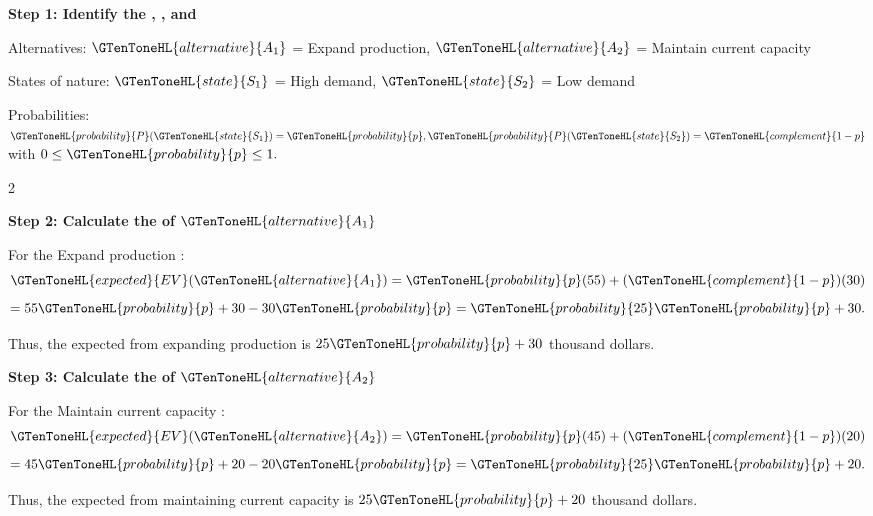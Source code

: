 	\textbf{Step 1: Identify the ,   , and }
	
	Alternatives:
	$\GTenToneHL{alternative}{A_1}$ = Expand production,
	$\GTenToneHL{alternative}{A_2}$ = Maintain current capacity
	
	States of nature:
	$\GTenToneHL{state}{S_1}$ = High demand,
	$\GTenToneHL{state}{S_2}$ = Low demand
	
	Probabilities:
	$
	\GTenToneHL{probability}{P}(\GTenToneHL{state}{S_1})=\GTenToneHL{probability}{p},
	\GTenToneHL{probability}{P}(\GTenToneHL{state}{S_2})=\GTenToneHL{complement}{1-p}
	$
	with
	$
	0\leq \GTenToneHL{probability}{p}\leq1.
	$
	
	\vspace{-3mm}
	
	\noindent
	\setlength{\columnseprule}{0.4pt} 
	\begin{multicols}{2}
		\vspace{0pt}
		
		\textbf{Step 2: Calculate the   of $\GTenToneHL{alternative}{A_1}$}
		
		For the Expand production :
		\[
		\GTenToneHL{expected}{EV}(\GTenToneHL{alternative}{A_1})
		=
		\GTenToneHL{probability}{p}(55)
		+
		(\GTenToneHL{complement}{1-p})(30)
		\]
		\[
		=
		55\GTenToneHL{probability}{p}+30-30\GTenToneHL{probability}{p}
		=
		\GTenToneHL{probability}{25}\GTenToneHL{probability}{p}+30.
		\]
		
		Thus, the expected  from expanding production is
		$25\GTenToneHL{probability}{p}+30$ thousand dollars.
		
		\columnbreak
		
		\textbf{Step 3: Calculate the   of $\GTenToneHL{alternative}{A_2}$}
		
		For the Maintain current capacity :
		\[
		\GTenToneHL{expected}{EV}(\GTenToneHL{alternative}{A_2})
		=
		\GTenToneHL{probability}{p}(45)
		+
		(\GTenToneHL{complement}{1-p})(20)
		\]
		\[
		=
		45\GTenToneHL{probability}{p}+20-20\GTenToneHL{probability}{p}
		=
		\GTenToneHL{probability}{25}\GTenToneHL{probability}{p}+20.
		\]
		
		Thus, the expected  from maintaining current capacity is
		$25\GTenToneHL{probability}{p}+20$ thousand dollars.
		
	\end{multicols}
	
